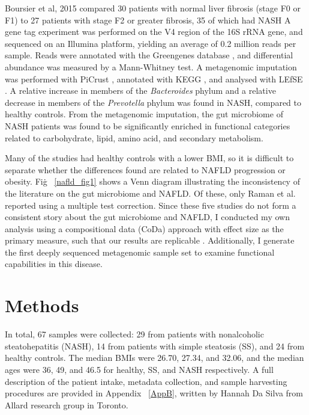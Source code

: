 Boursier et al, 2015 \cite{boursier2016severity} compared 30 patients with normal liver fibrosis (stage F0 or F1) to 27 patients with stage F2 or greater fibrosis, 35 of which had NASH A gene tag experiment was performed on the V4 region of the 16S rRNA gene, and sequenced on an Illumina platform, yielding an average of 0.2 million reads per sample. Reads were annotated with the Greengenes database \cite{desantis2006greengenes}, and differential abundance was measured by a Mann-Whitney test. A metagenomic imputation was performed with PiCrust \cite{langille2013predictive}, annotated with KEGG \cite{kanehisa2000kegg}, and analysed with LEfSE \cite{segata2011metagenomic}. A relative increase in members of the \textit{Bacteroides} phylum and a relative decrease in members of the \textit{Prevotella} phylum was found in NASH, compared to healthy controls. From the metagenomic imputation, the gut microbiome of NASH patients was found to be significantly enriched in functional categories related to carbohydrate, lipid, amino acid, and secondary metabolism.

Many of the studies had healthy controls with a lower BMI, so it is difficult to separate whether the differences found are related to NAFLD progression or obesity. Fig\. ~\ref{nafld_fig1} shows a Venn diagram illustrating the inconsistency of the literature on the gut microbiome and NAFLD. Of these, only Raman et al. \cite{raman2013fecal} reported using a multiple test correction. Since these five studies do not form a consistent story about the gut microbiome and NAFLD, I conducted my own analysis using a compositional data (CoDa) approach with effect size as the primary measure, such that our results are replicable \cite{halsey2015fickle}. Additionally, I generate the first deeply sequenced metagenomic sample set to examine functional capabilities in this disease.

\FloatBarrier

\section{Methods}
In total, 67 samples were collected: 29 from patients with nonalcoholic steatohepatitis (NASH), 14 from patients with simple steatosis (SS), and 24 from healthy controls. The median BMIs were 26.70, 27.34, and 32.06, and the median ages were 36, 49, and 46.5 for healthy, SS, and NASH respectively. A full description of the patient intake, metadata collection, and sample harvesting procedures are provided in Appendix ~\ref{AppB}, written by Hannah Da Silva from Allard research group in Toronto.

